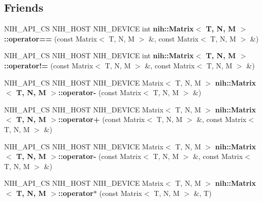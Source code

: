 \subsection*{\-Friends}
\begin{DoxyCompactItemize}
\item 
\hypertarget{group__linalg_gaa4d859c0fbdb4cf65243ef2761b7aeb7}{
\-N\-I\-H\-\_\-\-A\-P\-I\-\_\-\-C\-S \-N\-I\-H\-\_\-\-H\-O\-S\-T \-N\-I\-H\-\_\-\-D\-E\-V\-I\-C\-E int {\bfseries nih\-::\-Matrix$<$ T, N, M $>$\-::operator==} (const \-Matrix$<$ \-T, \-N, \-M $>$ \&, const \-Matrix$<$ \-T, \-N, \-M $>$ \&)}
\label{group__linalg_gaa4d859c0fbdb4cf65243ef2761b7aeb7}

\item 
\hypertarget{group__linalg_ga443999af1925e0d0e44f8441c73ff2cc}{
\-N\-I\-H\-\_\-\-A\-P\-I\-\_\-\-C\-S \-N\-I\-H\-\_\-\-H\-O\-S\-T \-N\-I\-H\-\_\-\-D\-E\-V\-I\-C\-E int {\bfseries nih\-::\-Matrix$<$ T, N, M $>$\-::operator!=} (const \-Matrix$<$ \-T, \-N, \-M $>$ \&, const \-Matrix$<$ \-T, \-N, \-M $>$ \&)}
\label{group__linalg_ga443999af1925e0d0e44f8441c73ff2cc}

\item 
\hypertarget{group__linalg_ga5c7fa91653401bed75a2c3b0b1678c18}{
\-N\-I\-H\-\_\-\-A\-P\-I\-\_\-\-C\-S \-N\-I\-H\-\_\-\-H\-O\-S\-T \-N\-I\-H\-\_\-\-D\-E\-V\-I\-C\-E \*
\-Matrix$<$ \-T, \-N, \-M $>$ {\bfseries nih\-::\-Matrix$<$ T, N, M $>$\-::operator-\/} (const \-Matrix$<$ \-T, \-N, \-M $>$ \&)}
\label{group__linalg_ga5c7fa91653401bed75a2c3b0b1678c18}

\item 
\hypertarget{group__linalg_gaa7b9b7b0244fcc9a64f4f4bb45a20aca}{
\-N\-I\-H\-\_\-\-A\-P\-I\-\_\-\-C\-S \-N\-I\-H\-\_\-\-H\-O\-S\-T \-N\-I\-H\-\_\-\-D\-E\-V\-I\-C\-E \*
\-Matrix$<$ \-T, \-N, \-M $>$ {\bfseries nih\-::\-Matrix$<$ T, N, M $>$\-::operator+} (const \-Matrix$<$ \-T, \-N, \-M $>$ \&, const \-Matrix$<$ \-T, \-N, \-M $>$ \&)}
\label{group__linalg_gaa7b9b7b0244fcc9a64f4f4bb45a20aca}

\item 
\hypertarget{group__linalg_ga1ea26a7b60552c90fe0b1a70483a8a0b}{
\-N\-I\-H\-\_\-\-A\-P\-I\-\_\-\-C\-S \-N\-I\-H\-\_\-\-H\-O\-S\-T \-N\-I\-H\-\_\-\-D\-E\-V\-I\-C\-E \*
\-Matrix$<$ \-T, \-N, \-M $>$ {\bfseries nih\-::\-Matrix$<$ T, N, M $>$\-::operator-\/} (const \-Matrix$<$ \-T, \-N, \-M $>$ \&, const \-Matrix$<$ \-T, \-N, \-M $>$ \&)}
\label{group__linalg_ga1ea26a7b60552c90fe0b1a70483a8a0b}

\item 
\hypertarget{group__linalg_ga9edaf812fed1fb430494129e31049c9e}{
\-N\-I\-H\-\_\-\-A\-P\-I\-\_\-\-C\-S \-N\-I\-H\-\_\-\-H\-O\-S\-T \-N\-I\-H\-\_\-\-D\-E\-V\-I\-C\-E \*
\-Matrix$<$ \-T, \-N, \-M $>$ {\bfseries nih\-::\-Matrix$<$ T, N, M $>$\-::operator$\ast$} (const \-Matrix$<$ \-T, \-N, \-M $>$ \&, \-T)}
\label{group__linalg_ga9edaf812fed1fb430494129e31049c9e}


\end{DoxyCompactItemize}
